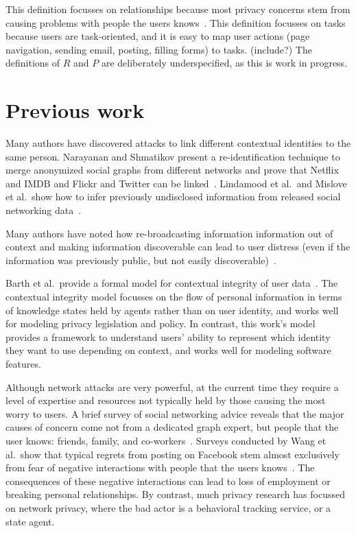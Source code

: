 \documentclass{llncs}
\begin{document}
This definition focusses on relationships because most privacy concerns stem
from causing problems with people the users knows~\cite{wang}. This definition
focusses on tasks because users are task-oriented, and it is easy to map user
actions (page navigation, sending email, posting, filling forms) to tasks.
(include?) The definitions of $R$ and $P$ are deliberately underspecified, as
this is work in progress.

\section{Previous work}

Many authors have discovered attacks to link different contextual identities to
the same person. Narayanan and Shmatikov present a re-identification technique
to merge anonymized social graphs from different networks and prove that
Netflix and IMDB and Flickr and Twitter can be
linked~\cite{narayanan1,narayanan2}. Lindamood et al.~and Mislove et al.~show
how to infer previously undisclosed information from released social networking
data~\cite{lindamood,mislove}.

Many authors have noted how re-broadcasting information information out of
context and making information discoverable can lead to user distress (even if
the information was previously public, but not easily
discoverable)~\cite{boyd1,chew,nissenbaum}.

Barth et al.~provide a formal model for contextual integrity of user
data~\cite{barth}. The contextual integrity model focusses on the flow of
personal information in terms of knowledge states held by agents rather than on
user identity, and works well for modeling privacy legislation and policy. In
contrast, this work's model provides a framework to understand users' ability
to represent which identity they want to use depending on context, and works
well for modeling software features.

\begin{comment}TODO: figure out how to cite this. Why is this short
paper's model worth pursuing? It's simpler, and focusses on the user rather
than data.
\end{comment}

Although network attacks are very powerful, at the current time they require a
level of expertise and resources not typically held by those causing the most
worry to users. A brief survey of social networking advice reveals that the
major causes of concern come not from a dedicated graph expert, but people that
the user knows: friends, family, and co-workers~\cite{fbtips2,fbtips1}.
Surveys conducted by Wang et al.~show that typical regrets from posting on
Facebook stem almost exclusively from fear of negative interactions with people
that the users knows~\cite{wang}. The consequences of these negative
interactions can lead to loss of employment or breaking personal relationships.
By contrast, much privacy research has focussed on network privacy, where the
bad actor is a behavioral tracking service, or a state agent.
\end{document}
